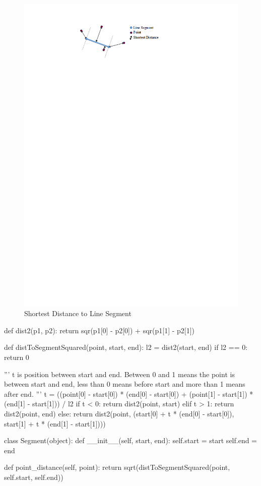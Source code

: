\begin{figure}[!ht]
	\centering
	\includegraphics[scale=0.85]{img/sprint3linesegment.png}
	\caption{Shortest Distance to Line Segment}
	\label{fig:sprint3-linesegment}
\end{figure}

\begin{code}[label={lst:sprint3-dist}, caption={Distance Between Point and Line Segment}, language={Python}, style={PythonDoc}]
def dist2(p1, p2):
	return sqr(p1[0] - p2[0]) + sqr(p1[1] - p2[1])

def distToSegmentSquared(point, start, end):
	l2 = dist2(start, end)
	if l2 == 0:
		return 0

	'''
	t is position between start and end.
	Between 0 and 1 means the point is between start and end,
	less than 0 means before start and more than 1 means after end.
	'''
	t = ((point[0] - start[0]) * (end[0] - start[0]) + (point[1] - start[1]) * (end[1] - start[1])) / l2
	if t < 0:
		return dist2(point, start)
	elif t > 1:
		return dist2(point, end)
	else:
		return dist2(point, (start[0] + t * (end[0] - start[0]),
		                     start[1] + t * (end[1] - start[1])))

class Segment(object):
	def __init__(self, start, end):
		self.start = start
		self.end = end

	def point_distance(self, point):
		return sqrt(distToSegmentSquared(point, self.start, self.end))
\end{code}

